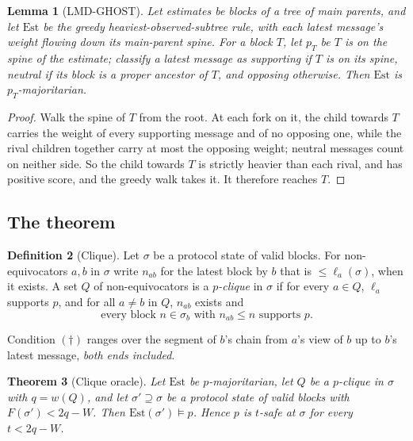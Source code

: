 \documentclass[11pt]{article}
\newtheorem{theorem}{Theorem}[section]
\newtheorem{lemma}[theorem]{Lemma}
\theoremstyle{definition}
\newtheorem{definition}[theorem]{Definition}
\theoremstyle{remark}
\newcommand{\Est}{\mathrm{Est}}
\begin{document}
\begin{lemma}[LMD-GHOST]\label{lem:ghost}
Let estimates be blocks of a tree of main parents, and let $\Est$ be the
greedy heaviest-observed-subtree rule, with each latest message's weight
flowing down its main-parent spine. For a block $T$, let $p_T$ be
\emph{$T$ is on the spine of the estimate}; classify a latest message as
supporting if $T$ is on its spine, neutral if its block is a proper ancestor of
$T$, and opposing otherwise. Then $\Est$ is $p_T$-majoritarian.
\end{lemma}

\begin{proof}
Walk the spine of $T$ from the root. At each fork on it, the child towards $T$
carries the weight of every supporting message and of no opposing one, while
the rival children together carry at most the opposing weight; neutral
messages count on neither side. So the child towards $T$ is strictly heavier
than each rival, and has positive score, and the greedy walk takes it. It
therefore reaches $T$.
\end{proof}

\subsection{The theorem}

\begin{definition}[Clique]\label{def:clique}
Let $\sigma$ be a protocol state of valid blocks. For non-equivocators $a,b$
in $\sigma$ write $n_{ab}$ for the latest block by $b$ that is
$\le\ell_a(\sigma)$, when it exists. A set $Q$ of non-equivocators is a
\emph{$p$-clique} in $\sigma$ if for every $a\in Q$, $\ell_a$ supports $p$, and
for all $a\ne b$ in $Q$, $n_{ab}$ exists and
\[
\text{every block } n\in\sigma_b \text{ with } n_{ab}\le n \text{ supports } p .
\tag{$\dagger$}
\]
\end{definition}

Condition $(\dagger)$ ranges over the segment of $b$'s chain from $a$'s view of
$b$ up to $b$'s latest message, \emph{both ends included}.

\begin{theorem}[Clique oracle]\label{thm:clique}
Let $\Est$ be $p$-majoritarian, let $Q$ be a $p$-clique in $\sigma$ with
$q=w(Q)$, and let $\sigma'\supseteq\sigma$ be a protocol state of valid blocks
with $F(\sigma')<2q-W$. Then $\Est(\sigma')\models p$. Hence $p$ is $t$-safe at
$\sigma$ for every $t<2q-W$.
\end{theorem}
\end{document}
